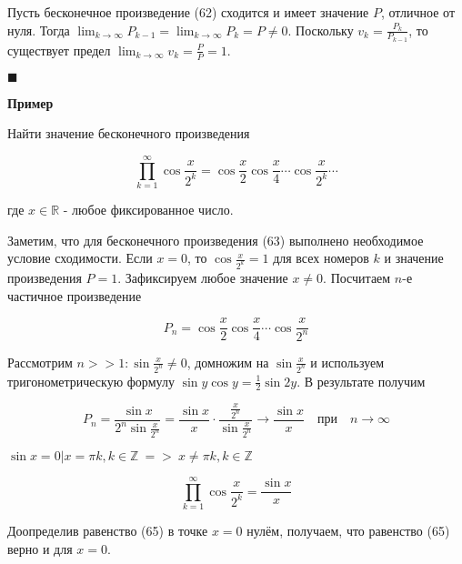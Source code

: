  Пусть бесконечное произведение (62) сходится и имеет значение $P$, отличное от нуля. Тогда $\displaystyle\lim_{k \rightarrow \infty} P_{k - 1} = \displaystyle\lim_{k \rightarrow \infty} P_k = P \neq 0$. Поскольку $v_k = \frac{P_k}{P_{k - 1}}$, то существует предел $\displaystyle\lim_{k \rightarrow \infty} v_k = \frac{P}{P} = 1$.
 
 \begin{flushright}
 	$\blacksquare$
 \end{flushright}
 
 \textbf{Пример}
 
 Найти значение бесконечного произведения
 
 \begin{equation}
 	\displaystyle\prod_{k = 1}^\infty \cos\frac{x}{2^k} = \cos\frac{x}{2} \cos\frac{x}{4} \cdots \cos\frac{x}{2^k} \cdots
 \end{equation}
 
 где $x \in \mathbb{R}$ - любое фиксированное число.
 
 Заметим, что для бесконечного произведения (63) выполнено необходимое условие сходимости. Если $x = 0$, то $\cos\frac{x}{2^k} = 1$ для всех номеров $k$ и значение произведения $P = 1$. Зафиксируем любое значение $x \neq 0$. Посчитаем $n$-е частичное произведение
 
\begin{equation}
	P_n = \cos\frac{x}{2} \cos\frac{x}{4} \cdots \cos\frac{x}{2^n}
\end{equation}

Рассмотрим $n >> 1 \colon \sin \frac{x}{2^n} \neq 0$, домножим на $\sin \frac{x}{2^n}$ и используем тригонометрическую формулу $\sin y \cos y = \frac{1}{2}\sin 2y$. В результате получим

\begin{equation*}
	P_n = \frac{\sin x}{2^n \sin\frac{x}{2^n}} = \frac{\sin x}{x} \cdot \frac{\frac{x}{2^n}}{\sin \frac{x}{2^n}} \rightarrow \frac{\sin x}{x}\quad \mbox{при} \quad n \rightarrow \infty
\end{equation*}

$\sin x = 0 | x = \pi k, k \in \mathbb{Z}\ =>\ x\neq \pi k, k\in \mathbb{Z}$

\begin{equation}
	\displaystyle\prod_{k = 1}^\infty \cos\frac{x}{2^k} = \frac{\sin x}{x}
\end{equation}

Доопределив равенство (65) в точке $x = 0$ нулём, получаем, что равенство (65) верно и для $x = 0$.

